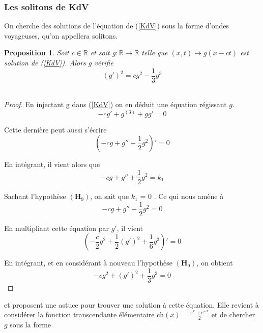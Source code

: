 \documentclass[12pt,a4paper]{article}
\newtheorem{prop}[dfn]{\textbf{Proposition}}
\numberwithin{equation}{section}
\begin{document}
\subsubsection{Les solitons de KdV}
On cherche des solutions de l'équation de (\ref{KdV}) sous la forme d'ondes voyageuses, qu'on appellera solitons. 
\begin{prop}
    Soit $c \in \mathbb{R}$ et soit $g:\mathbb{R}\rightarrow\mathbb{R}$ telle que $ (x,t)\mapsto g(x - ct)$ est solution de (\ref{KdV}). Alors $g$ vérifie
    \begin{equation}
     (g')^2  = cg^2 - \frac{1}{3}g^3 \label{eq_soliton}
    \end{equation}\\
\end{prop}
\begin{proof}
    En injectant g dans (\ref{KdV}) on en déduit une équation régissant $g$.
\begin{equation*}
    -cg' + g^{(3)} + gg' = 0 
\end{equation*}

Cette dernière peut aussi s'écrire
\begin{equation*}
    \left(-cg + g'' + \frac{1}{2}g^2\right)' = 0 
\end{equation*}

En intégrant, il vient alors que
\begin{equation*}
        -cg + g'' + \frac{1}{2}g^2 = k_1
\end{equation*}

Sachant l'hypothèse $(\textbf{H}_9)$, on sait que $k_1$ = 0 . Ce qui nous amène à 
\begin{equation*}
        -cg + g'' + \frac{1}{2}g^2 = 0
\end{equation*}

En multipliant cette équation par $g'$, il vient 
\begin{equation*}
        \left(-\frac{c}{2}g^2 + \frac{1}{2}(g')^2 + \frac{1}{6}g^3\right)' = 0
\end{equation*}

En intégrant, et en considérant à nouveau l'hypothèse $(\textbf{H}_9)$, on obtient
\begin{equation*}
     -cg^2 + (g')^2 + \frac{1}{3}g^3 = 0
\end{equation*}
\end{proof}

\cite{Garnier} et \cite{MT} proposent une astuce pour trouver une solution à cette équation. Elle revient à considérer la fonction transcendante élémentaire $\text{ch}(x) = \frac{e^x+ e^{-x}}{2}$ et de chercher $g$ sous la forme 
\end{document}
